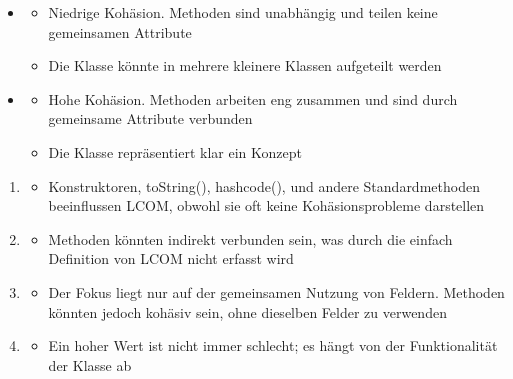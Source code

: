 \begin{infoBox}[title=Interpretation]
    \begin{itemize}
        \item {}
        \begin{itemize}
            \item Niedrige Kohäsion. Methoden sind unabhängig und teilen keine gemeinsamen Attribute
            \item Die Klasse könnte in mehrere kleinere Klassen aufgeteilt werden
        \end{itemize}
        \item {}
        \begin{itemize}
            \item Hohe Kohäsion. Methoden arbeiten eng zusammen und sind durch gemeinsame Attribute verbunden
            \item Die Klasse repräsentiert klar ein Konzept
        \end{itemize}
    \end{itemize}
\end{infoBox}
\begin{infoBox}[title=Probleme und Herausforderungen der Formalisierung]
    \begin{enumerate}
        \item {}
        \begin{itemize}
            \item Konstruktoren, toString(), hashcode(), und andere Standardmethoden beeinflussen LCOM, obwohl sie oft keine Kohäsionsprobleme darstellen
        \end{itemize}
        \item{}
        \begin{itemize}
            \item Methoden könnten indirekt verbunden sein, was durch die einfach Definition von LCOM nicht erfasst wird
        \end{itemize}
        \item {}
        \begin{itemize}
            \item Der Fokus liegt nur auf der gemeinsamen Nutzung von Feldern. Methoden könnten jedoch kohäsiv sein, ohne dieselben Felder zu verwenden
        \end{itemize}
        \item {}
        \begin{itemize}
            \item Ein hoher Wert ist nicht immer schlecht; es hängt von der Funktionalität der Klasse ab
        \end{itemize}
    \end{enumerate}
\end{infoBox}
